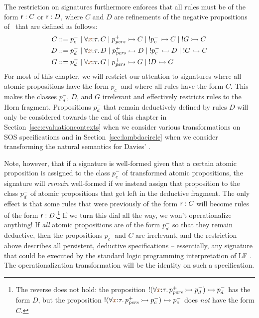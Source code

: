 The restriction on signatures furthermore enforces that all rules must
be of the form ${\sf r} : C$ or ${\sf r} : D$, where $C$ and $D$ are
refinements of the negative propositions of \sls~that are defined as
follows:
\begin{align*}
C & ::= p^-_{c} 
    \mid \forall \lf x{:}\tau.\, C
    \mid p^+_\mpers \lefti C
    \mid {!}p^-_c \lefti C
    \mid {!}G \lefti C \\
D & ::= p^-_{d}
    \mid \forall \lf x{:}\tau.\, D
    \mid p^+_\mpers \lefti D
    \mid {!}p^-_c \lefti D
    \mid {!}G \lefti C \\
G & ::= p^-_d 
    \mid \forall \lf x{:}\tau.\, G
    \mid p^+_\mpers \lefti G
    \mid {!}D \lefti G
\end{align*}
For most of this chapter, we will 
restrict our attention to signatures where all atomic
propositions have the form $p^-_c$ and where all rules have the form
$C$. This makes the classes $p^-_d$, $D$, and $G$ irrelevant and
effectively restricts rules to the Horn fragment.  Propositions
$p^-_d$ that remain deductively defined by rules $D$ will only be
considered towards the end of this chapter in
Section~\ref{sec:evaluationcontexts} when we consider various
transformations on SOS specifications and in
Section~\ref{sec:lambdacircle} when we consider transforming the
natural semantics for Davies' \rowan.

Note, however, that if a signature is well-formed given that a certain
atomic proposition is assigned to the class $p^-_c$ of transformed
atomic propositions, the signature will {\it remain} well-formed if we
instead assign that proposition to the class $p^-_d$ of atomic
propositions that get left in the deductive fragment. The only effect
is that some rules that were previously of the form ${\sf r} : C$ will
become rules of the form ${\sf r} : D$.\footnote{The reverse does not
  hold: the proposition ${!}(\forall\lf{x}{:}\tau.\,p^+_\mpers \lefti
  p^-_d) \lefti p^-_d$ has the form $D$, but the proposition
  ${!}(\forall\lf{x}{:}\tau.\,p^+_\mpers \lefti p^-_c) \lefti p^-_c$
  does {\it not} have the form $C$.} If we turn this dial all the way,
we won't operationalize anything! If {\it all} atomic propositions are
of the form $p^-_d$ so that they remain deductive, then the
propositions $p^-_c$ and $C$ are irrelevant, and the restriction above
describes all persistent, deductive specifications -- essentially, any
signature that could be executed by the standard logic programming
interpretation of LF \cite{pfenning89elf}. The operationalization
transformation will be the identity on such a specification.

